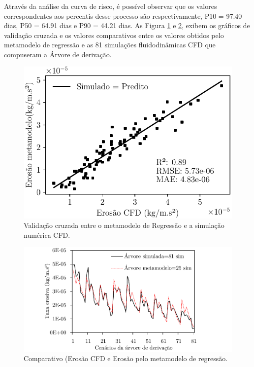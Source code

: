 Através da análise da curva de risco, é possível observar que os valores correspondentes aos percentis desse processo são respectivamente, P10 = 97.40 dias, P50 = 64.91 dias e P90 = 44.21 dias. As Figura \ref{fig:scattermodelo} e \ref{fig:compmetaarvore}, exibem os gráficos de validação cruzada e os valores comparativos entre os valores obtidos pelo metamodelo de regressão e as 81 simulações fluidodinâmicas CFD que compuseram a Árvore de derivação.

\begin{figure}[H] 
    \centering  
    \includegraphics{Figuras/scatterModelo2.pdf}  
    \caption{Validação cruzada entre o metamodelo de Regressão e a simulação numérica CFD.}  
    \label{fig:scattermodelo}  
\end{figure}
\begin{figure}[H] 
    \centering  
    \includegraphics{Figuras/compmetaarvore.pdf}  
    \caption{Comparativo (Erosão CFD e Erosão pelo metamodelo de regressão.}  
    \label{fig:compmetaarvore}  
\end{figure}


